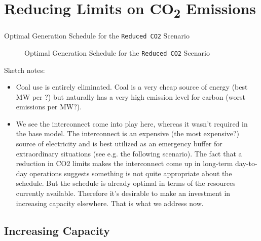 \documentclass{article}
\begin{document}
    
    
    \section{Reducing Limits on CO\textsubscript{2} Emissions}
    
    \begin{table}[h!]\label{table:basic-optgensched}
    	\centering
    	\caption{Optimal Generation Schedule for the \texttt{Reduced CO2} Scenario}
    \end{table}
    
    \begin{figure}[H]
        \centering
    	\caption{Optimal Generation Schedule for the \texttt{Reduced CO2} Scenario}
    \end{figure}
    
    Sketch notes:
    
    \begin{itemize}
    	
        \item  Coal use is entirely eliminated.  Coal is a very cheap source of energy (best MW per \textsterling?) but naturally has a very high emission level for carbon (worst emissions per MW?).
        
        \item We see the interconnect come into play here, whereas it wasn't required in the base model.  The interconnect is an expensive (the most expensive?) source of electricity and is best utilized as an emergency buffer for extraordinary situations (see e.g. the following scenario).  The fact that a reduction in CO2 limits makes the interconnect come up in long-term day-to-day operations suggests something is not quite appropriate about the schedule.  But the schedule is already optimal in terms of the resources currently available.  Therefore it's desirable to make an investment in increasing capacity elsewhere.  That is what we address now.
    
    \end{itemize}
    
    
    \subsection{Increasing Capacity}
    
\end{document}

